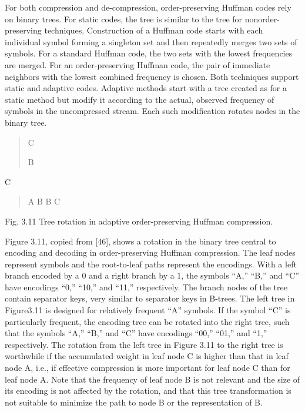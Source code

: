 For both compression and de-compression, order-preserving Huffman codes
rely on binary trees. For static codes, the tree is similar to the tree
for nonorder-preserving techniques. Construction of a Huffman code
starts with each individual symbol forming a singleton set and then
repeatedly merges two sets of symbols. For a standard Huffman code, the
two sets with the lowest frequencies are merged. For an order-preserving
Huffman code, the pair of immediate neighbors with the lowest combined
frequency is chosen. Both techniques support static and adaptive codes.
Adaptive methods start with a tree created as for a static method but
modify it according to the actual, observed frequency of symbols in the
uncompressed stream. Each such modification rotates nodes in the binary
tree.

\begin{quote}
C

B
\end{quote}

C

\begin{quote}
A B B C
\end{quote}

Fig. 3.11 Tree rotation in adaptive order-preserving Huffman
compression.

Figure 3.11, copied from {[}46{]}, shows a rotation in the binary tree
central to encoding and decoding in order-preserving Huffman
compression. The leaf nodes represent symbols and the root-to-leaf paths
represent the encodings. With a left branch encoded by a 0 and a right
branch by a 1, the symbols ``A,'' ``B,'' and ``C'' have encodings ``0,''
``10,'' and ``11,'' respectively. The branch nodes of the tree contain
separator keys, very similar to separator keys in B-trees. The left tree
in Figure3.11 is designed for relatively frequent ``A'' symbols. If the
symbol ``C'' is particularly frequent, the encoding tree can be rotated
into the right tree, such that the symbols ``A,'' ``B,'' and ``C'' have
encodings ``00,'' ``01,'' and ``1,'' respectively. The rotation from the
left tree in Figure 3.11 to the right tree is worthwhile if the
accumulated weight in leaf node C is higher than that in leaf node A,
i.e., if effective compression is more important for leaf node C than
for leaf node A. Note that the frequency of leaf node B is not relevant
and the size of its encoding is not affected by the rotation, and that
this tree transformation is not suitable to minimize the path to node B
or the representation of B.

